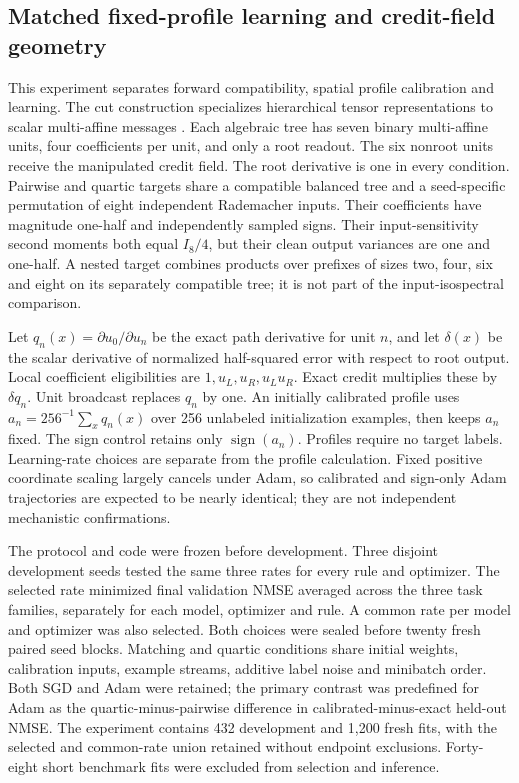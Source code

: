 \subsection{Matched fixed-profile learning and credit-field geometry}

This experiment separates forward compatibility, spatial profile calibration and learning. The cut construction specializes hierarchical tensor representations to scalar multi-affine messages \citep{hackbusch2009tensor,grasedyck2010hierarchical}. Each algebraic tree has seven binary multi-affine units, four coefficients per unit, and only a root readout. The six nonroot units receive the manipulated credit field. The root derivative is one in every condition. Pairwise and quartic targets share a compatible balanced tree and a seed-specific permutation of eight independent Rademacher inputs. Their coefficients have magnitude one-half and independently sampled signs. Their input-sensitivity second moments both equal $I_8/4$, but their clean output variances are one and one-half. A nested target combines products over prefixes of sizes two, four, six and eight on its separately compatible tree; it is not part of the input-isospectral comparison.

Let $q_n(x)=\partial u_0/\partial u_n$ be the exact path derivative for unit $n$, and let $\delta(x)$ be the scalar derivative of normalized half-squared error with respect to root output. Local coefficient eligibilities are $1,u_L,u_R,u_Lu_R$. Exact credit multiplies these by $\delta q_n$. Unit broadcast replaces $q_n$ by one. An initially calibrated profile uses $a_n=256^{-1}\sum_x q_n(x)$ over 256 unlabeled initialization examples, then keeps $a_n$ fixed. The sign control retains only $\operatorname{sign}(a_n)$. Profiles require no target labels. Learning-rate choices are separate from the profile calculation. Fixed positive coordinate scaling largely cancels under Adam, so calibrated and sign-only Adam trajectories are expected to be nearly identical; they are not independent mechanistic confirmations.

The protocol and code were frozen before development. Three disjoint development seeds tested the same three rates for every rule and optimizer. The selected rate minimized final validation NMSE averaged across the three task families, separately for each model, optimizer and rule. A common rate per model and optimizer was also selected. Both choices were sealed before twenty fresh paired seed blocks. Matching and quartic conditions share initial weights, calibration inputs, example streams, additive label noise and minibatch order. Both SGD and Adam were retained; the primary contrast was predefined for Adam as the quartic-minus-pairwise difference in calibrated-minus-exact held-out NMSE. The experiment contains 432 development and 1,200 fresh fits, with the selected and common-rate union retained without endpoint exclusions. Forty-eight short benchmark fits were excluded from selection and inference.

